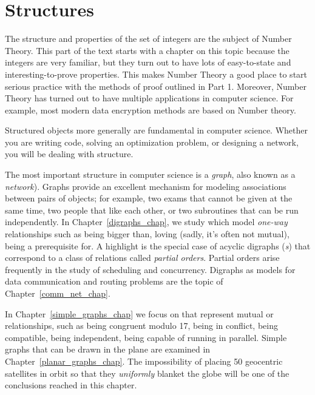 \part{Structures}
\label{part:structures}

\partintro

The structure and properties of the set of integers are the subject of
Number Theory.  This part of the text starts with a chapter on this
topic because the integers are very familiar, but they turn out to
have lots of easy-to-state and interesting-to-prove properties.  This
makes Number Theory a good place to start serious practice with the
methods of proof outlined in Part 1.  Moreover, Number Theory has
turned out to have multiple applications in computer science.  For
example, most modern data encryption methods are based on Number
theory.

Structured objects more generally are fundamental in computer science.
Whether you are writing code, solving an optimization problem, or
designing a network, you will be dealing with structure.
\iffalse
  The better
you can understand the structure, the better your results will be.
And if you can reason about structure, then you will be in a good
position to convince others (and yourself) that your results are
worthy.\fi
The most important structure in computer science is a \emph{graph},
also known as a \emph{network}).  Graphs provide an excellent
mechanism for modeling associations between pairs of objects; for
example, two exams that cannot be given at the same time, two people
that like each other, or two subroutines that can be run
independently.  In Chapter~\ref{digraphs_chap}, we study
\emph{} which model \emph{one-way} relationships
such as being bigger than, loving (sadly, it's often not mutual),
being a prerequisite for.  A highlight is the special case of acyclic
digraphs (\emph{s}) that correspond to a class of relations
called \emph{partial orders}.  Partial orders arise frequently in the
study of scheduling and concurrency.  Digraphs as models for data
communication and routing problems are the topic of
Chapter~\ref{comm_net_chap}.

In Chapter~\ref{simple_graphs_chap} we focus on \emph{} that represent mutual or \emph{}
relationships, such as being congruent modulo 17, being in conflict,
being compatible, being independent, being capable of running in
parallel.  Simple graphs that can be drawn in the plane are examined
in Chapter~\ref{planar_graphs_chap}.  The impossibility of placing 50
geocentric satellites in orbit so that they \emph{uniformly} blanket
the globe will be one of the conclusions reached in this chapter.

\iffalse
This part of the text concludes with Chapter 13
which elaborates the use of the \emph{\idx{state machines}} in program
verification and modeling concurrent computation.
\fi

\endinput
